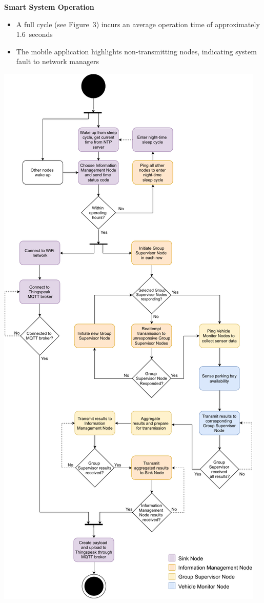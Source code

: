 \documentclass[landscape,a1paper,fontscale=0.47]{baposter} %
\newcommand{\compresslist}{ %
\setlength{\itemsep}{1pt}
\setlength{\parskip}{0pt}
\setlength{\parsep}{0pt}
}
\begin{document}
\begin{poster}
{\begin{multicols}{2}
		
	
		\textbf{Smart System Operation}
			\begin{itemize}[leftmargin=13pt]\compresslist
				\item A full cycle (see Figure~3) incurs an average operation time of approximately 1.6~seconds
				\item The mobile application highlights non-transmitting nodes, indicating system fault to network managers
			\end{itemize}
		
		\vspace{1mm}
		
		\begin{center}
			\includegraphics[width=0.9\columnwidth]{flowFinalPoster-cropped}
		\end{center}
	

\end{multicols}}
\end{poster}
\end{document}
